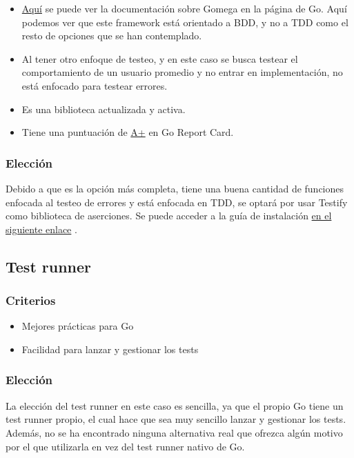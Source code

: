 \begin{itemize}
\item
  \href{https://pkg.go.dev/github.com/onsi/gomega}{Aquí} \cite{go-dev} se puede ver la
  documentación sobre Gomega en la página de Go. Aquí podemos ver que
  este framework está orientado a BDD, y no a TDD como el resto de
  opciones que se han contemplado.
\item
  Al tener otro enfoque de testeo, y en este caso se busca testear el
  comportamiento de un usuario promedio y no entrar en implementación,
  no está enfocado para testear errores.
\item
  Es una biblioteca actualizada y activa.
\item
  Tiene una puntuación de
  \href{https://goreportcard.com/report/github.com/onsi/gomega}{A+} en
  Go Report Card.
\end{itemize}

\subsubsection{Elección}

Debido a que es la opción más completa, tiene una buena cantidad de
funciones enfocada al testeo de errores y está enfocada en TDD, se
optará por usar Testify como biblioteca de aserciones. Se puede acceder a
la guía de instalación
\href{https://pkg.go.dev/github.com/stretchr/testify\#section-readme}{en
el siguiente enlace} \cite{go-dev}.

\subsection{Test runner}

\subsubsection{Criterios}

\begin{itemize}
\item
  Mejores prácticas para Go
\item
  Facilidad para lanzar y gestionar los tests
\end{itemize}

\subsubsection{Elección}

La elección del test runner en este caso es sencilla, ya que el propio Go
tiene un test runner propio, el cual hace que sea muy sencillo lanzar y
gestionar los tests. Además, no se ha encontrado ninguna alternativa
real que ofrezca algún motivo por el que utilizarla en vez del test runner
nativo de Go.

